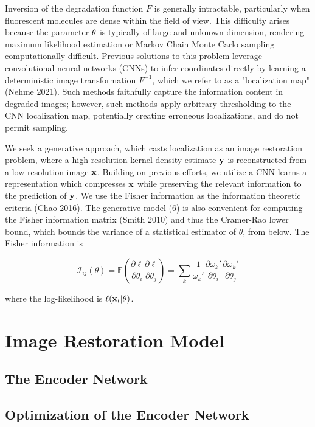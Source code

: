 \documentclass{article}
\begin{document}
Inversion of the degradation function $F$ is generally intractable, particularly when fluorescent molecules are dense within the field of view. This difficulty arises because the parameter $\bold{\theta}$ is typically of large and unknown dimension, rendering maximum likelihood estimation or Markov Chain Monte Carlo sampling computationally difficult. Previous solutions to this problem leverage convolutional neural networks (CNNs) to infer coordinates directly by learning a deterministic image transformation $F^{-1}$, which we refer to as a "localization map" (Nehme 2021). Such methods faithfully capture the information content in degraded images; however, such methods apply arbitrary thresholding to the CNN localization map, potentially creating erroneous localizations, and do not permit sampling. 

We seek a generative approach, which casts localization as an image restoration problem, where a high resolution kernel density estimate $\bold{y}$ is reconstructed from a low resolution image $\bold{x}$. Building on previous efforts, we utilize a CNN learns a representation which compresses $\bold{x}$ while preserving the relevant information to the prediction of $\bold{y}$. We use the Fisher information as the information theoretic criteria (Chao 2016). The generative model (6) is also convenient for computing the Fisher information matrix (Smith 2010) and thus the Cramer-Rao lower bound, which bounds the variance of a statistical estimator of $\theta$, from below. The Fisher information is

\begin{equation}
\mathcal{I}_{ij}(\theta) = \mathbb{E}\left(\frac{\partial \ell}{\partial\theta_{i}}\frac{\partial\ell}{\partial\theta_{j}}\right) = \sum_{k}\frac{1}{\omega_{k}'}\frac{\partial \omega_{k}'}{\partial\theta_{i}}\frac{\partial \omega_{k}'}{\partial\theta_{j}}
\end{equation}

where the log-likelihood is $\ell (\bold{x}_{t}|\theta)$.

\section{Image Restoration Model}

\subsection{The Encoder Network}

\subsection{Optimization of the Encoder Network}
\end{document}

